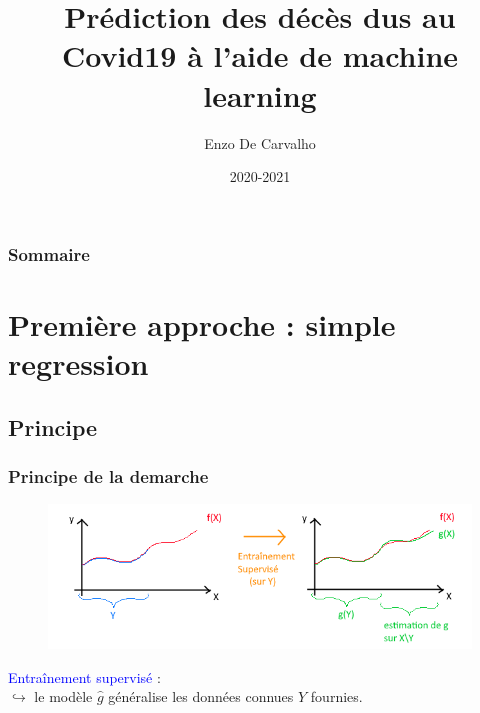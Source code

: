 \documentclass{beamer}[aspectratio = 43]
\title{Prédiction des décès dus au Covid19 à l'aide de machine learning}
\subtitle{}
\author{Enzo De Carvalho}
\institute{numéro d'inscription : 29448}
\date{2020-2021}
\begin{document}
\begin{frame}
	\maketitle
\end{frame}

\begin{frame}
	\frametitle{Sommaire}
	\tableofcontents
\end{frame}

\section{Première approche : simple regression}
\subsection{Principe}
\begin{frame}
	\frametitle{Principe de la demarche}
	\begin{figure}[t]
		\centering
		\includegraphics[scale=0.65]{super_schema}
	\end{figure}
	\textcolor{blue}{Entraînement supervisé} :\\
	$\hookrightarrow$ le modèle $\hat{g}$ généralise les données connues $Y$ fournies.
\end{frame}
\end{document}
